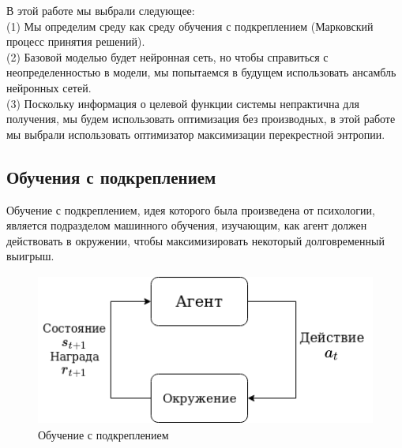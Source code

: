 \documentclass[a4paper,12pt]{article}
\begin{document}
В этой работе мы выбрали следующее:\\
(1) Мы определим среду как среду обучения с подкреплением (Марковский процесс принятия решений).\\
(2) Базовой моделью будет нейронная сеть, но чтобы справиться с неопределенностью в модели, мы попытаемся в будущем использовать ансамбль нейронных сетей.\\
(3) Поскольку информация о целевой функции системы непрактична для получения, мы будем использовать оптимизация без производных, в этой работе мы выбрали использовать оптимизатор максимизации перекрестной энтропии.


\newpage
\subsection{Обучения с подкреплением}
Обучение с подкреплением, идея которого была произведена от психологии, является подразделом машинного обучения, изучающим, как агент должен действовать в окружении, чтобы максимизировать некоторый долговременный выигрыш. 

\begin{figure}[H]
    \centering
    \includegraphics[height=5cm]{img/RL_ru.png}
    \caption{Обучение с подкреплением}
    \label{fig:my_label}
\end{figure}
\end{document}
